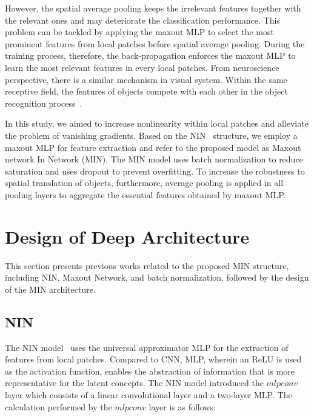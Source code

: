 \documentclass[10pt,twocolumn,letterpaper]{article}
\begin{document}
However, the spatial average pooling keeps the irrelevant features together with the relevant ones and may deteriorate the classification performance.
This problem can be tackled by applying the maxout MLP to select the most prominent features from local patches before spatial average pooling. 
During the training process, therefore, the back-propagation enforces the maxout MLP to learn the most relevant features in every local patches.
From neuroscience perspective, there is a similar mechanism in visual system.
Within the same receptive field, the features of objects compete with each other in the object recognition process~\cite{desimone1995neural}.

In this study, we aimed to increase nonlinearity within local patches and alleviate the problem of vanishing gradients. Based on the NIN~\cite{DBLP:journals/corr/LinCY13} structure, we employ a maxout MLP for feature extraction and refer to the proposed model as Maxout network In Network (MIN).
The MIN model uses batch normalization to reduce saturation and uses dropout to prevent overfitting.
To increase the robustness to spatial translation of objects, furthermore, average pooling is applied in all pooling layers to aggregate the essential features obtained by maxout MLP.


\section{Design of Deep Architecture}
	This section presents previous works related to the proposed MIN structure, including NIN, Maxout Network, and batch normalization, followed by the design of the MIN architecture.

\subsection{NIN}

	The NIN model~\cite{DBLP:journals/corr/LinCY13} uses the universal approximator MLP for the extraction of features from local patches.
Compared to CNN, MLP, wherein an ReLU is used as the activation function, enables the abstraction of information that is more representative for the latent concepts.
The NIN model introduced the $mlpconv$ layer which consists of a linear convolutional layer and a two-layer MLP. The calculation performed by the $mlpconv$ layer is as follows:
\end{document}
